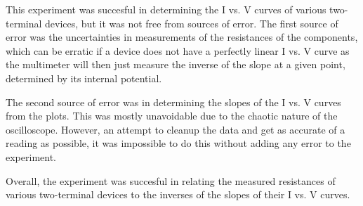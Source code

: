 \begin{paper}

	This experiment was succesful in determining the I vs. V curves of various two-terminal devices, but it was not free from sources of error. The first source of error was the uncertainties in measurements of the resistances of the components, which can be erratic if a device does not have a perfectly linear I vs. V curve as the multimeter will then just measure the inverse of the slope at a given point, determined by its internal potential.
	
	The second source of error was in determining the slopes of the I vs. V curves from the plots. This was mostly unavoidable due to the chaotic nature of the oscilloscope. However, an attempt to cleanup the data and get as accurate of a reading as possible, it was impossible to do this without adding any error to the experiment.
	
	Overall, the experiment was succesful in relating the measured resistances of various two-terminal devices to the inverses of the slopes of their I vs. V curves.
	


\end{paper}
